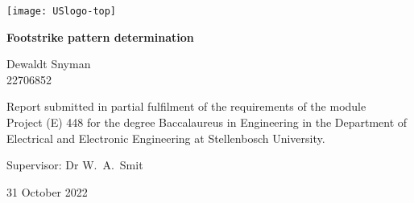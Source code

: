 \graphicspath{{frontmatter/fig/}}

\begin{titlepage}
	\begin{center}
		
		\texttt{[image: USlogo-top]}
		
		\vfill
		
		{\sffamily \bfseries \huge Footstrike pattern determination \par}
		
		\vfill
		
		{\large {\Large Dewaldt Snyman} \\ 22706852 \par}
		
		\vfill
		
		\vfill
		
		{Report submitted in partial fulfilment of the requirements of the module \\
			Project (E) 448 for the degree Baccalaureus in Engineering in the Department of
			Electrical and Electronic Engineering at Stellenbosch University. \par}
		
		\vfill
		
		{\large {Supervisor}: Dr W.\ A.\ Smit} %
		
		\vfill
		
		{\Large 31 October 2022}
	\end{center}
\end{titlepage}
